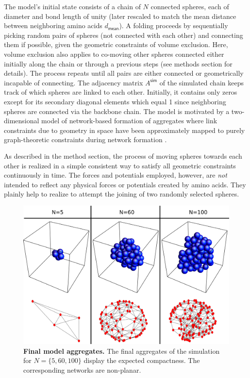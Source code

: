 \documentclass[9pt]{elife}
\begin{document}
The model's initial state consists of a chain of $N$ connected spheres, each of diameter and bond length of unity (later rescaled to match the mean distance between neighboring amino acids $d_{\textsf{mean}}$). A folding proceeds by sequentially picking random pairs of spheres (not connected with each other) and connecting them if possible, given the geometric constraints of volume exclusion. Here, volume exclusion also applies to co-moving other spheres connected either initially along the chain or through a previous steps (see methods section for details).
The process repeats until all pairs are either connected or geometrically incapable of connecting. The adjacency matrix $A^{\textsf{sim}}$ of the simulated chain keeps track of which spheres are linked to each other. Initially, it contains only zeros except for its secondary diagonal elements which equal 1 since neighboring spheres are connected via the backbone chain. The model is motivated by a two-dimensional model of network-based formation of aggregates where link constraints due to geometry in space have been approximately mapped to purely graph-theoretic constraints during network formation \cite{molkenthin2016scaling}.

As described in the method section, the process of moving spheres towards each other is realized in a simple consistent way to satisfy all geometric constraints continuously in time. The forces and potentials employed, however, are \textit{not} intended to reflect any physical forces or potentials created by amino acids. They plainly help to realize to attempt the joining of two randomly selected spheres.

\begin{figure}[h]
        \centering
	\includegraphics[width=\columnwidth]{Grapegrid.png}
        \caption{\textbf{Final model aggregates.} The final aggregates of the simulation for $N=\{5,60,100\}$ display the expected compactness. The corresponding networks are non-planar.} 
        \label{fig.sim}
\end{figure}
\end{document}
